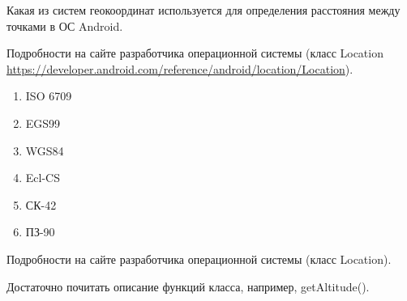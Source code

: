 
Какая из систем геокоординат используется для определения расстояния между точками в ОС Android.

Подробности на сайте разработчика операционной системы (класс Location \url{https://developer.android.com/reference/android/location/Location}).

\begin{enumerate}
    \item ISO 6709
    \item EGS99
    \item WGS84
    \item Ecl-CS
    \item СК-42
    \item ПЗ-90
\end{enumerate}

\explanationSection

Подробности на сайте разработчика операционной системы (класс Location).

Достаточно почитать описание функций класса, например, getAltitude().

